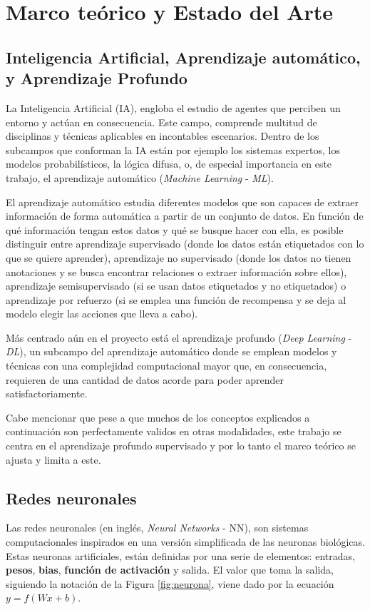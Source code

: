 \section{Marco teórico y Estado del Arte}

\subsection{Inteligencia Artificial, Aprendizaje automático, y Aprendizaje Profundo}
La Inteligencia Artificial (IA), engloba el estudio de agentes que perciben un entorno y actúan en consecuencia. Este campo, comprende multitud de disciplinas y técnicas aplicables en incontables escenarios. Dentro de los subcampos que conforman la IA están por ejemplo los sistemas expertos, los modelos probabilísticos, la lógica difusa, o, de especial importancia en este trabajo, el aprendizaje automático (\textit{Machine Learning} - \textit{ML}). 

El aprendizaje automático estudia diferentes modelos que son capaces de extraer información de forma automática a partir de un conjunto de datos. En función de qué información tengan estos datos y qué se busque hacer con ella, es posible distinguir entre aprendizaje supervisado (donde los datos están etiquetados con lo que se quiere aprender), aprendizaje no supervisado (donde los datos no tienen anotaciones y se busca encontrar relaciones o extraer información sobre ellos), aprendizaje semisupervisado (si se usan datos etiquetados y no etiquetados) o aprendizaje por refuerzo (si se emplea una función de recompensa y se deja al modelo elegir las acciones que lleva a cabo).

Más centrado aún en el proyecto está el aprendizaje profundo (\textit{Deep Learning} - \textit{DL}), un subcampo del aprendizaje automático donde se emplean modelos y técnicas con una complejidad computacional mayor que, en consecuencia, requieren de una cantidad de datos acorde para poder aprender satisfactoriamente.

Cabe mencionar que pese a que muchos de los conceptos explicados a continuación son perfectamente validos en otras modalidades, este trabajo se centra en el aprendizaje profundo supervisado y por lo tanto el marco teórico se ajusta y limita a este. 

\subsection{Redes neuronales}
Las redes neuronales (en inglés, \textit{Neural Networks} - NN), son sistemas computacionales inspirados en una versión simplificada de las neuronas biológicas. Estas neuronas artificiales, están definidas por una serie de elementos: entradas, \textbf{pesos}, \textbf{bias}, \textbf{función de activación} y salida. El valor que toma la salida, siguiendo la notación de la Figura \ref{fig:neurona}, viene dado por la ecuación $y = f(Wx + b)$.

